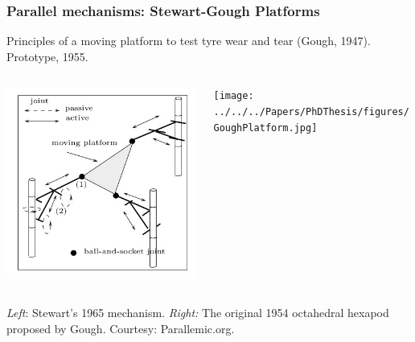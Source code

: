 	\begin{frame}
		\frametitle{Parallel mechanisms: Stewart-Gough Platforms}
		\footnotesize{Principles of a moving platform to test tyre wear and tear (Gough, 1947). Prototype, 1955.}
		\newline
		\begin{columns}[b]
			\begin{column}{.48\columnwidth}			
				\begin{tcolorbox}[colframe=blue!80!green, coltitle=white!80,toggle enlargement=none]
					\centering 
					\includegraphics[width=\textwidth]{figures/Stewart.jpg}
				\end{tcolorbox}
			\end{column}
			\begin{column}{.48\columnwidth}			
				\begin{tcolorbox}[colframe=blue!80!green, 	coltitle=white!80,toggle enlargement=none]
				\centering 
				\texttt{[image: ../../../Papers/PhDThesis/figures/GoughPlatform.jpg]}
				\end{tcolorbox}
			\end{column}	
		\end{columns}
		\centering \footnotesize{\textit{Left}: Stewart's 1965 mechanism. \textit{Right:} The original 1954 octahedral hexapod proposed by  Gough. Courtesy: Parallemic.org.}
	\end{frame}

